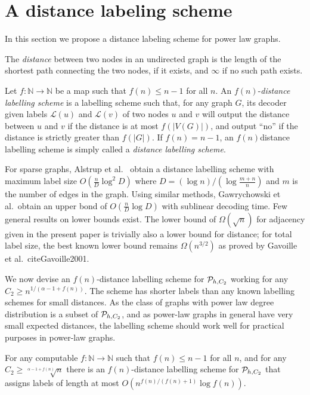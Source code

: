 \section{A distance labeling scheme}\label{Sec:Distance}
In this section we propose a distance labeling scheme for power law graphs. 

The \emph{distance} between two nodes in an undirected graph is the length of the shortest path connecting
the two nodes, if it exists, and $\infty$ if no such path exists.

Let $f : \mathbb{N} \longrightarrow \mathbb{N}$ be a map such that
$f(n) \leq  n -1$ for all $n$. An $f(n)$-\emph{distance labelling scheme} is a labelling
scheme such that, for any graph $G$, its decoder given labels $\mathcal{L}(u)$ and $\mathcal{L}(v)$ of two nodes $u$ and $v$
will output the distance between $u$ and $v$ if the distance is at most $f(\vert V(G) \vert)$, and output ``no'' if the distance
is  strictly greater than $f(\vert G \vert)$. If $f(n) = n-1$,
an $f(n)$distance labelling scheme is simply called a \emph{distance labelling scheme}.

For sparse graphs,
Alstrup et al.\ \cite{DBLP:journals/corr/AlstrupDKP15} obtain a distance labelling scheme with maximum label size
$O(\frac{n}{D} \log^2 D)$ where $D = (\log n)/(\log \frac{m+n}{n})$ and $m$ is the number of edges
in the graph.  Using similar methods, Gawrychowski et al.\ obtain an upper bond of \cite{DBLP:journals/corr/GawrychowskiKU15}
$O(\frac{n}{D} \log D)$ with sublinear decoding time. Few general results on lower bounds exist. The lower bound of $\Omega(\sqrt{n})$ for adjacency given in the present paper is trivially also a lower bound for distance; for total label size, the best known lower bound remains $\Omega(n^{3/2})$ as proved by Gavoille et al.\ cite{Gavoille2001}.

We now devise an $f(n)$-distance labelling scheme for $ \mathcal{P}_{h,C_2}$ working for any $C_2 \geq n^{1/(\alpha - 1 +f(n))}$.
The scheme has shorter labels than any known labelling schemes for small distances. As
the class of graphs with power law degree distribution is a subset of $ \mathcal{P}_{h,C_2}$, and as power-law graphs in general
have very small expected distances, the labelling scheme should work well for practical purposes in power-law graphs.

\begin{lemma}\label{lem:sparse_small_dist}
For any computable $f : \mathbb{N} \longrightarrow \mathbb{N}$ such that
$f(n) \leq n -1$ for all $n$, and for any $C_2 \geq \sqrt[\alpha-1+f(n)]{n}$ there is an $f(n)$-distance labelling scheme for $ \mathcal{P}_{h,C_2}$
that assigns labels of length at most $O(n^{f(n)/(f(n) + 1)} \log f(n))$.
\end{lemma}

